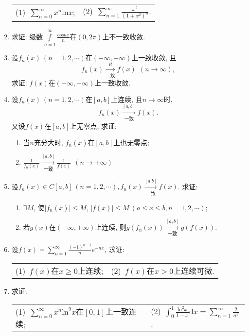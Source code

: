 \begin{enumerate}
\begin{table}[H]
	\begin{tabular}{ll}
		(1)\ $\sum\limits_{n=0}^{\infty}x^n\mathrm{ln}x$;\qquad \qquad \qquad \qquad \qquad &(2)\ $\sum\limits_{n=1}^{\infty}\frac{x^2}{(1+x^2)^n}$.
	\end{tabular}
\end{table}
\item 求证: 级数$\int\limits_{n=1}^{\infty}\frac{\mathrm{cos}nx}{n}$在$(0,2\pi)$上不一致收敛.
\item 设$f_n(x)\ (n=1,2,\cdots)$在$(-\infty,+\infty)$上一致收敛, 且$$
f_n(x)\xrightarrow[\text{一致}]{R}f(x)\ \ (n\rightarrow \infty),$$
求证: $f(x)$在$(-\infty,+\infty)$上一致收敛.
\item 设$f_n(x)\ (n=1,2,\cdots)$在$[a,b]$上连续, 且$n\rightarrow \infty$时,$$
f_n(x)\xrightarrow[\text{一致}]{[a,b]}f(x).$$
又设$f(x)$在$[a,b]$上无零点, 求证:
\begin{enumerate}
	\item 当$n$充分大时, $f_n(x)$在$[a,b]$上也无零点;
	\item $\frac{1}{f_n(x)}\xrightarrow[\text{一致}]{[a,b]}\frac{1}{f(x)}\ \ (n\rightarrow +\infty)$
\end{enumerate}
	\item 设$f_n(x)\in C[a,b]\ (n=1,2,\cdots),f_n(x)\xrightarrow[\text{一致}]{[a.b]}f(x)$. 求证:
	\begin{enumerate}
		\item $\exists M$, 使$|f_n(x)|\le M$, $|f(x)|\le M\ (a\le x\le b,n=1,2,\cdots)$;
		\item 若$g(x)$在$(-\infty,+\infty)$上连续, 则$g(f_n(x))\xrightarrow[\text{一致}]{[a,b]}g(f(x))$.
	\end{enumerate}
\item 设$f(x) = \sum\limits_{n=1}^{\infty}\frac{(-1)^{n-1}}{n}e^{-nx}$, 求证:
\begin{table}[H]
	\begin{tabular}{ll}
		(1)\ $f(x)$在$x\ge 0$上连续; \qquad \qquad \qquad \qquad&(2)\ $f(x)$在$x>0$上连续可微.
	\end{tabular}
\end{table}
\item 求证:
\begin{table}[H]
	\begin{tabular}{ll}
		(1)\ $\sum\limits_{n=0}^{\infty}x^n\mathrm{ln}^2x$在$[0,1]$上一致连续;\qquad \qquad \qquad \qquad \qquad &(2)\ $\displaystyle{\int_{0}^{1}\frac{\mathrm{ln}^2x}{1-x}\mathrm{d}x=\sum_{n=1}^{\infty}\frac{2}{n^3}}$.
		\end{tabular}

\end{table}
\end{enumerate}

